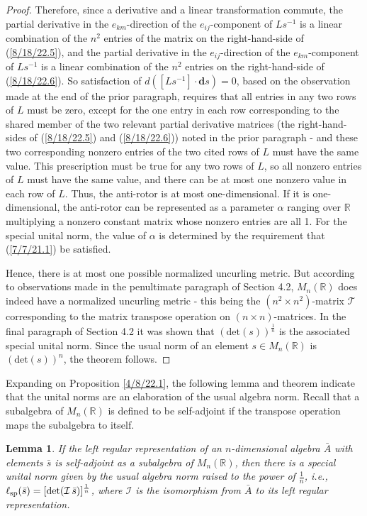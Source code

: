 \documentclass{amsart}
\newtheorem{lemma}[theorem]{Lemma}
\theoremstyle{definition}
\numberwithin{theorem}{section}
\numberwithin{equation}{section}
\begin{document}
\begin{proof}
Therefore, since a derivative and a linear transformation commute, the partial derivative in the $e_{km}$-direction of the $e_{ij}$-component of $Ls^{-1}$ is a linear combination of the $n^2$ entries of the matrix on the right-hand-side of (\ref{8/18/22.5}), and  the partial derivative in the $e_{ij}$-direction of the $e_{km}$-component of $Ls^{-1}$ is a linear combination of the $n^2$ entries on the right-hand-side of (\ref{8/18/22.6}).
So satisfaction of \mbox{$d\left([Ls^{-1}]\cdot \mathbf{d}s\right) = 0$,} based on the observation made at the end of the prior paragraph, requires that all entries in any two rows of $L$ must be zero, except for the one entry in each row corresponding to the shared member of the two relevant partial derivative matrices (the right-hand-sides of (\ref{8/18/22.5}) and (\ref{8/18/22.6})) noted in the prior paragraph - and these two corresponding nonzero entries of the two cited rows of $L$ must have the same value.  This prescription must be true for any two rows of $L$, so all nonzero entries of $L$ must have the same value, and there can be at most one nonzero value in each row of $L$.  Thus, the anti-rotor is at most one-dimensional. If it is one-dimensional, the anti-rotor can be represented as a parameter $\alpha$ ranging over $\mathbb{R}$ multiplying a nonzero constant matrix whose nonzero entries are all 1.  
For the special unital norm, the value of $\alpha$ is determined by the requirement that (\ref{7/7/21.1}) be satisfied. 


Hence, there is at most one possible normalized uncurling metric.  But according to observations made in the penultimate paragraph of Section 4.2, $ M_n(\mathbb{R})$ does indeed have a normalized uncurling metric - this being the $(n^2\times n^2)$-matrix $\mathcal{T}$ corresponding to the matrix transpose operation on $(n\times n)$-matrices.  In the final paragraph of Section 4.2 it was shown that $(\mbox{det}(s))^{\frac{1}{n}}$ is the associated special unital norm.  Since the usual norm of an element $s\in M_n(\mathbb{R})$ is $(\mbox{det}(s))^n$, the theorem follows.
 \end{proof}
 
 Expanding on Proposition \ref{4/8/22.1}, the following lemma and theorem indicate that the unital norms are an elaboration of the usual algebra norm.  Recall that a subalgebra of $M_n(\mathbb{R})$ is defined to be self-adjoint if the transpose operation maps the subalgebra to itself.
 

 
  \begin{lemma}\label{5/13/22.1} If the left regular representation of an $n$-dimensional algebra $\bar{A}$ with elements $\bar{s}$ is self-adjoint as a subalgebra of $M_n(\mathbb{R})$, then there is a special unital norm given by the usual algebra norm raised to the power of $\frac{1}{n}$, i.e., $\ell_{\rm sp}(\bar{s}) = [{\rm det}(\mathcal{I}\, \bar{s})]^\frac{1}{n}$, where $\mathcal{I}$ is the isomorphism from $\bar{A}$ to its left regular representation.
\end{lemma}
\end{document}
